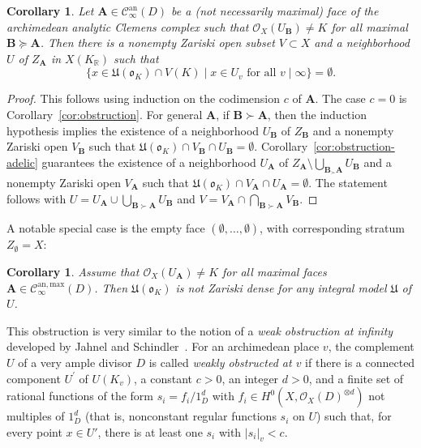 \documentclass[a4paper, twoside, 10pt]{amsart}
\newcommand{\uA}{{\boldsymbol{A}}}
\newcommand{\uB}{{\boldsymbol{B}}}
\newcommand{\cC}{\mathcal{C}}
\newcommand{\cO}{\mathcal{O}}
\newcommand{\mU}{\mathfrak{U}}
\newcommand{\fo}{\mathfrak{o}}
\newcommand{\RR}{\mathbb{R}}
\newcommand{\Can}{\cC^{\mathrm{an}}}
\newcommand{\Canmax}{\cC^{\mathrm{an,max}}}
\newcommand{\abs}[1]{\left\lvert#1\right\rvert}
\newtheorem{corollary}[theorem]{Corollary}
\theoremstyle{definition}
\begin{document}
\begin{corollary}\label{cor:subfaces}
  Let $\uA\in\Can_\infty(D)$ be a (not necessarily maximal) face of the archimedean analytic Clemens complex such that $\cO_X(U_\uB)\ne K$ for all maximal $\uB\succeq \uA$.
  Then there is a nonempty Zariski open subset $V\subset X$ and a neighborhood $U$ of $Z_\uA$ in $X(K_\RR)$ such that
  \[
    \{x\in \mU(\fo_K) \cap V(K) \mid x\in U_v \text{ for all } v\mid\infty\} = \emptyset.
  \]
\end{corollary}
\begin{proof}
  This follows using induction on the codimension $c$ of $\uA$.
  The case $c=0$ is Corollary~\ref{cor:obstruction}.
  For general $\uA$, if $\uB \succ \uA$, then the induction hypothesis implies the existence of a neighborhood $U_\uB$ of $Z_\uB$ and a nonempty Zariski open $V_\uB$ such that $\mU(\fo_K)\cap V_\uB\cap U_\uB = \emptyset$. Corollary~\ref{cor:obstruction-adelic} guarantees the existence of a neighborhood $U_\uA$ of $Z_\uA \setminus \bigcup_{\uB_\succ \uA} U_\uB$ and a nonempty Zariski open $V_\uA$ such that $\mU(\fo_K)\cap V_\uA\cap U_\uA = \emptyset$.
  The statement follows with $U = U_\uA \cup \bigcup_{\uB\succ\uA} U_\uB$ and $V = V_\uA \cap \bigcap_{\uB\succ\uA} V_\uB$.
\end{proof}

A notable special case is the empty face $(\emptyset,\dots,\emptyset)$, with corresponding stratum $Z_{\emptyset}=X$:

\begin{corollary}\label{cor:density-obstruction}
  Assume that $\cO_X(U_\uA)\ne K$ for all maximal faces $\uA \in \Canmax_\infty(D)$. Then $\mU(\fo_K)$ is not Zariski dense for any integral model $\mU$ of $U$.
\end{corollary}

This obstruction is very similar to the notion of a \emph{weak obstruction at infinity} developed by Jahnel and Schindler~\cite[Def.~2.2]{MR3736498}. For an archimedean place $v$, the complement $U$ of a very ample divisor $D$ is called \emph{weakly obstructed at $v$}
if there is a connected component $U^\prime$ of $U(K_v)$,
a constant $c>0$, an integer $d>0$, and a finite set of rational functions of the form $s_i=f_i/1_D^d$ with $f_i\in H^0(X,\cO_X(D)^{\otimes d})$ not multiples of $1_D^d$ (that is, nonconstant regular functions $s_i$ on $U$)
such that, for every point $x\in U'$, there is at least one $s_i$ with $\abs{s_i}_v < c$.
\end{document}
